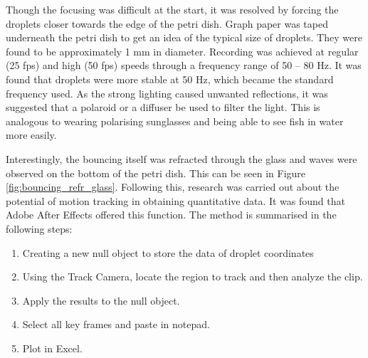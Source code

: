 Though the focusing was difficult at the start, it was resolved by forcing the droplets closer towards the edge of the petri dish. Graph paper was taped underneath the petri dish to get an idea of the typical size of droplets. They were found to be approximately 1 mm in diameter. Recording was achieved at regular (25 fps) and high (50 fps) speeds through a frequency range of 50 -- 80 Hz. It was found that droplets were more stable at 50 Hz, which became the standard frequency used. As the strong lighting caused unwanted reflections, it was suggested that a polaroid or a diffuser be used to filter the light. This is analogous to wearing polarising sunglasses and being able to see fish in water more easily.

Interestingly, the bouncing itself was refracted through the glass and waves were observed on the bottom of the petri dish. This can be seen in Figure \ref{fig:bouncing_refr_glass}. Following this, research was carried out about the potential of motion tracking in obtaining quantitative data. It was found that Adobe After Effects offered this function. The method is summarised in the following steps:

\begin{enumerate}
\item  Creating a new null object to store the data of droplet coordinates
\item  Using the Track Camera, locate the region to track and then analyze  the clip.
\item  Apply the results to the null object.
\item  Select all key frames and paste in notepad.
\item  Plot in Excel.
\end{enumerate}

